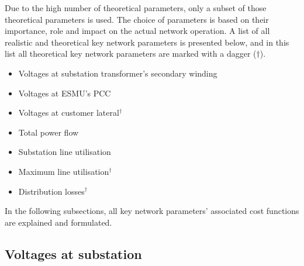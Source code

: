 Due to the high number of theoretical parameters, only a subset of those theoretical parameters is used.
The choice of parameters is based on their importance, role and impact on the actual network operation.
A list of all realistic and theoretical key network parameters is presented below, and in this list all theoretical key network parameters are marked with a dagger ($\dagger$).

\begin{itemize}
	\item Voltages at substation transformer's secondary winding
	\item Voltages at ESMU's PCC
	\item Voltages at customer lateral$^{\dagger}$
	\item Total power flow
	\item Substation line utilisation
	\item Maximum line utilisation$^{\dagger}$
	\item Distribution losses$^{\dagger}$
\end{itemize}

In the following subsections, all key network parameters' associated cost functions are explained and formulated.

\subsection{Voltages at substation}
\label{ch1:subsec:voltages-at-substation}



